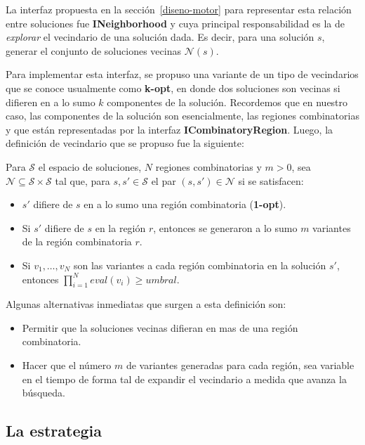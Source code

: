 La interfaz propuesta en la secci\'on~\ref{diseno-motor} para representar esta
relaci\'on entre soluciones fue \textbf{INeighborhood} y cuya principal
responsabilidad es la de \textit{explorar} el vecindario de una soluci\'on dada.
Es decir, para una soluci\'on $s$, generar el conjunto de soluciones vecinas
$\mathcal{N}(s)$. 

Para implementar esta interfaz, se propuso una variante de un tipo de
vecindarios que se conoce usualmente como \textbf{k-opt}, en donde dos
soluciones son vecinas si difieren en a lo sumo $k$ componentes de la
soluci\'on. Recordemos que en nuestro caso, las componentes de la soluci\'on son
esencialmente, las regiones combinatorias y que est\'an representadas por la
interfaz \textbf{ICombinatoryRegion}. Luego, la definici\'on de vecindario que
se propuso fue la siguiente:

\begin{definition}
 Para $\mathcal{S}$ el espacio de soluciones, $N$ regiones combinatorias y
$m>0$, sea $\mathcal{N} \subseteq \mathcal{S} \times \mathcal{S}$ tal que,
para $s, s' \in \mathcal{S}$ el par $(s,s') \in \mathcal{N}$ si se satisfacen:
\begin{itemize}
 \item $s'$ difiere de $s$ en a lo sumo una regi\'on combinatoria
(\textbf{1-opt}).
 \item Si $s'$ difiere de $s$ en la regi\'on $r$, entonces se generaron a lo
sumo $m$ variantes de la regi\'on combinatoria $r$.
 \item Si $v_{1}, \dots, v_{N}$ son las variantes a cada regi\'on combinatoria
en la soluci\'on $s'$, entonces $\prod_{i=1}^{N} eval(v_{i}) \ge umbral$.
\end{itemize}
\end{definition}

Algunas alternativas inmediatas que surgen a esta definici\'on son:
\begin{itemize}
 \item Permitir que la soluciones vecinas difieran en mas de una regi\'on
combinatoria.
 \item Hacer que el n\'umero $m$ de variantes generadas para cada regi\'on, sea
variable en el tiempo de forma tal de expandir el vecindario a medida que avanza
la b\'usqueda.
\end{itemize}

\subsection{La estrategia}


